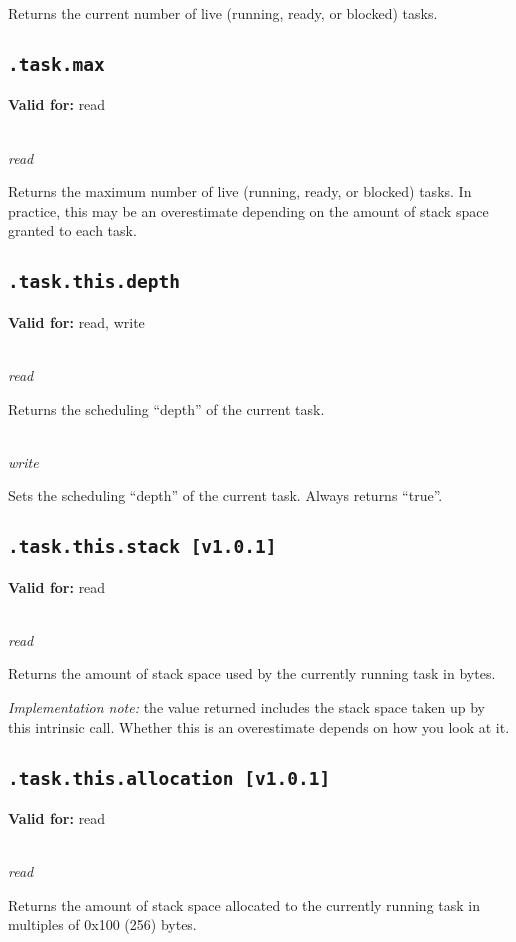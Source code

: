 \documentclass{article}
\begin{document}
Returns the current number of live (running, ready, or blocked) tasks.

\subsection{\texttt{.task.max}}
\textbf{Valid for:} read

~\\
\textit{read}

Returns the maximum number of live (running, ready, or blocked) tasks. In practice, this may be an overestimate depending on the amount of stack space granted to each task.

\subsection{\texttt{.task.this.depth}}
\textbf{Valid for:} read, write

~\\
\textit{read}

Returns the scheduling ``depth'' of the current task.

~\\
\textit{write}

Sets the scheduling ``depth'' of the current task. Always returns ``true''.

\subsection{\texttt{.task.this.stack [v1.0.1]}}
\textbf{Valid for:} read

~\\
\textit{read}

Returns the amount of stack space used by the currently running task in bytes.

\textit{Implementation note:} the value returned includes the stack space taken up by this intrinsic call.
Whether this is an overestimate depends on how you look at it.

\subsection{\texttt{.task.this.allocation [v1.0.1]}}
\textbf{Valid for:} read

~\\
\textit{read}

Returns the amount of stack space allocated to the currently running task in multiples of 0x100 (256) bytes.
\end{document}
